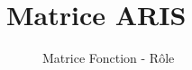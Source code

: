 \chapter{Matrice ARIS}

\begin{figure}[H]
    \label{fig-matrice}
    \noindent{}
    \caption{Matrice Fonction - Rôle}
\end{figure}


